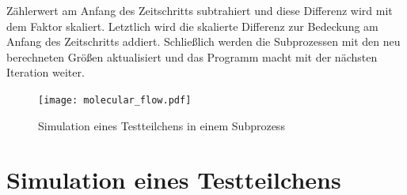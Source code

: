 \documentclass{listhesis}
\begin{document}
Zählerwert am Anfang des Zeitschritts subtrahiert und diese Differenz wird mit dem Faktor skaliert. Letztlich wird die skalierte Differenz zur Bedeckung am Anfang des Zeitschritts addiert. Schließlich werden die Subprozessen mit den neu berechneten Größen aktualisiert und das Programm macht mit der nächsten Iteration weiter.

\begin{figure}[t]
\centering
\texttt{[image: molecular\_flow.pdf]}
\caption{Simulation eines Testteilchens in einem Subprozess}
\label{fig:simulation}
\end{figure}

\section{Simulation eines Testteilchens} \label{section:molflow}
\end{document}
